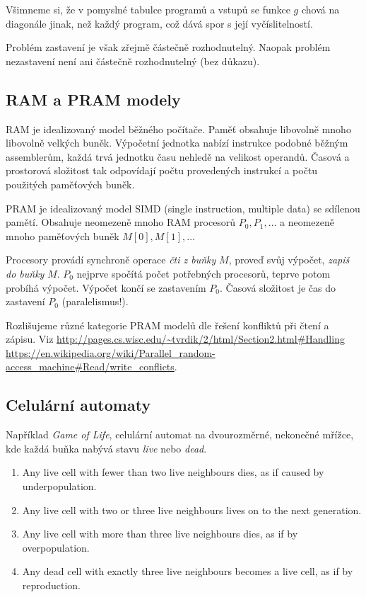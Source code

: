 Všimneme si, že v pomyslné tabulce programů a vstupů se funkce $g$ chová
na diagonále jinak, než každý program, což dává spor s její
vyčíslitelností.

Problém zastavení je však zřejmě částečně rozhodnutelný.
Naopak problém nezastavení není ani částečně rozhodnutelný (bez důkazu).

\subsection{RAM a PRAM modely}


RAM je idealizovaný model běžného počítače. Paměť obsahuje libovolně
mnoho libovolně velkých buněk. Výpočetní jednotka nabízí
instrukce podobné běžným assemblerům, každá trvá jednotku času nehledě
na velikost operandů. Časová a prostorová složitost tak odpovídají počtu
provedených instrukcí a počtu použitých paměťových buněk.

PRAM je idealizovaný model SIMD (single instruction, multiple data) se
sdílenou pamětí. Obsahuje
neomezeně mnoho RAM procesorů $P_0, P_1,\ldots$
a neomezeně mnoho paměťových buněk $M[0], M[1],\ldots$

Procesory provádí synchroně operace {\em čti z buňky} $M$, proveď svůj
výpočet, {\em zapiš do buňky} $M$.
$P_0$ nejprve spočítá počet potřebných procesorů, teprve potom probíhá
výpočet. Výpočet končí se zastavením $P_0$. Časová složitost je čas
do zastavení $P_0$ (paralelismus!).

Rozlišujeme různé kategorie PRAM modelů dle řešení konfliktů při čtení a
zápisu. Viz
\href{http://pages.cs.wisc.edu/~tvrdik/2/html/Section2.html#Handling}{http://pages.cs.wisc.edu/{\textasciitilde}tvrdik/2/html/Section2.html\#Handling}\\
\href{https://en.wikipedia.org/wiki/Parallel_random-access_machine#Read/write_conflicts}{https://en.wikipedia.org/wiki/Parallel\_random-access\_machine\#Read/write\_conflicts}.

\subsection{Celulární automaty}

Například {\em Game of Life}, celulární automat na dvourozměrné, nekonečné
mřížce, kde každá buňka nabývá stavu {\em live} nebo {\em dead}.

\begin{enumerate}
    \item Any live cell with fewer than two live neighbours dies, as if caused by underpopulation.
    \item Any live cell with two or three live neighbours lives on to the next generation.
    \item Any live cell with more than three live neighbours dies, as if by overpopulation.
    \item Any dead cell with exactly three live neighbours becomes a live cell, as if by reproduction.
\end{enumerate}

